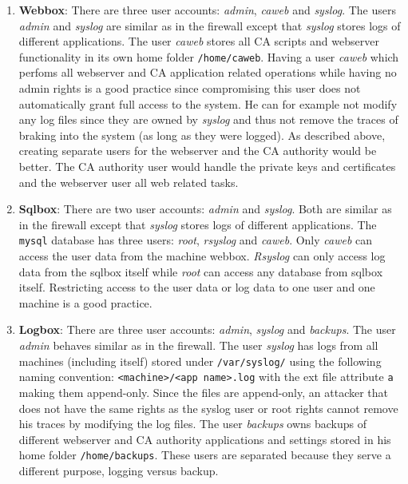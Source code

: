 \documentclass[english]{article}
\newcommand{\code}[1]{\texttt{#1}}
\begin{document}
\begin{enumerate}
\begin{enumerate}[label=(\alph*)]
\item \textbf{Webbox}: There are three user accounts: \textit{admin}, \textit{caweb} and \textit{syslog}. The users \textit{admin} and \textit{syslog} are similar as in the firewall except that \textit{syslog} stores logs of different applications. The user \textit{caweb} stores all CA scripts and webserver functionality in its own home folder \texttt{/home/caweb}. Having a user \textit{caweb} which perfoms all webserver and CA application related operations while having no admin rights is a good practice since compromising this user does not automatically grant full access to the system. He can for example not modify any log files since they are owned by \textit{syslog} and thus not remove the traces of braking into the system (as long as they were logged). As described above, creating separate users for the webserver and the CA authority would be better. The CA authority user would handle the private keys and certificates and the webserver user all web related tasks.

\item \textbf{Sqlbox}: There are two user accounts: \textit{admin} and \textit{syslog}. Both are similar as in the firewall except that \textit{syslog} stores logs of different applications. The \code{mysql} database has three users: \textit{root}, \textit{rsyslog} and \textit{caweb}. Only \textit{caweb} can access the user data from the machine webbox. \textit{Rsyslog} can only access log data from the sqlbox itself while \textit{root} can access any database from sqlbox itself. Restricting access to the user data or log data to one user and one machine is a good practice.

\item \textbf{Logbox}: There are three user accounts: \textit{admin}, \textit{syslog} and \textit{backups}. The user \textit{admin} behaves similar as in the firewall. The user \textit{syslog} has logs from all machines (including itself) stored under \texttt{/var/syslog/} using the following naming convention: \texttt{<machine>/<app name>.log} with the ext file attribute \texttt{a} making them append-only. Since the files are append-only, an attacker that does not have the same rights as the syslog user or root rights cannot remove his traces by modifying the log files. The user \textit{backups} owns backups of different webserver and CA authority applications and settings stored in his home folder \texttt{/home/backups}. These users are separated because they serve a different purpose, logging versus backup.
\end{enumerate}
\end{enumerate}
\end{document}
